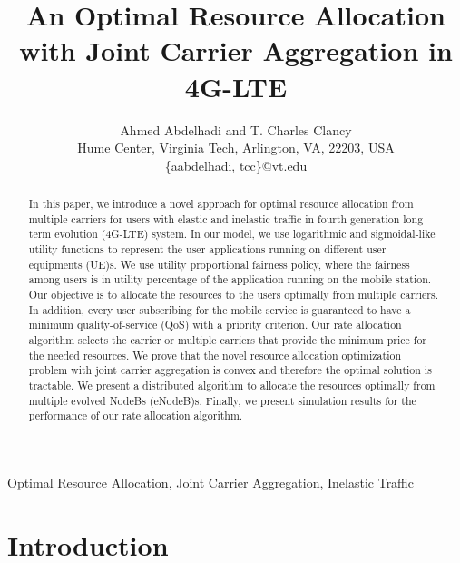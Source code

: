 \documentclass[conference]{IEEEtran}
\begin{document}
\title{An Optimal Resource Allocation with Joint Carrier Aggregation in 4G-LTE}
\author{Ahmed Abdelhadi and T. Charles Clancy \\
Hume Center, Virginia Tech, Arlington, VA, 22203, USA\\
\{aabdelhadi, tcc\}@vt.edu
}
\maketitle


\begin{abstract}
In this paper, we introduce a novel approach for optimal resource allocation from multiple carriers for users with elastic and inelastic traffic in fourth generation long term evolution (4G-LTE) system. In our model, we use logarithmic and sigmoidal-like utility functions to represent the user applications running on different user equipments (UE)s. We use utility proportional fairness policy, where the fairness among users is in utility percentage of the application running on the mobile station. Our objective is to allocate the resources to the users optimally from multiple carriers. In addition, every user subscribing for the mobile service is guaranteed to have a minimum quality-of-service (QoS) with a priority criterion. Our rate allocation algorithm selects the carrier or multiple carriers that provide the minimum price for the needed resources. We prove that the novel resource allocation optimization problem with joint carrier aggregation is convex and therefore the optimal solution 
is tractable. We present a distributed algorithm to allocate the resources optimally from multiple evolved NodeBs (eNodeB)s. Finally, we present simulation results for the performance of our rate allocation algorithm.
\end{abstract}

\begin{keywords}
Optimal Resource Allocation, Joint Carrier Aggregation, Inelastic Traffic
\end{keywords}

\providelength{\AxesLineWidth}       \setlength{\AxesLineWidth}{0.5pt}\providelength{\plotwidth}           \setlength{\plotwidth}{8cm}\providelength{\LineWidth}           \setlength{\LineWidth}{0.7pt}\providelength{\LineWidthTwo}        \setlength{\LineWidthTwo}{1.7pt}\providelength{\MarkerSize}          \setlength{\MarkerSize}{3.5pt}

\section{Introduction}\label{sec:intro}
\end{document}
